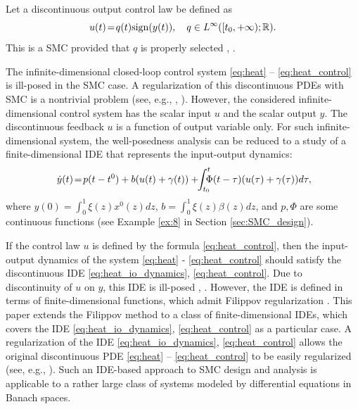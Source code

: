 \documentclass{article}
\newcommand{\R}{\mathbb{R}}
\newcommand{\sign}{\mathrm{sign}}
\begin{document}
Let  a discontinuous output control law  be defined as \vspace{-1mm}
\begin{equation}\label{eq:heat_control}
	u(t)\!=\!q(t)\sign(y(t)), \quad q\in L^{\infty}([t_0,+\infty);\R). \vspace{-1mm}
\end{equation}
This is a SMC  provided that $q$  is properly selected  \cite{Orlov_elal2004:IJC}, \cite{Orlov2020:Book}.

The infinite-dimensional closed-loop control system \eqref{eq:heat} -- \eqref{eq:heat_control} is ill-posed in the SMC case.  A regularization of this discontinuous PDEs  with SMC is a nontrivial problem 
 (see, e.g., \cite[pages 24-28]{Orlov2020:Book}, \cite{Mohet_etal2023:SCL}). 
 However, the considered infinite-dimensional control system has the scalar  input $u$ and the scalar output $y$. The discontinuous feedback $u$ is a function of  output variable only. For such infinite-dimensional system, the well-posedness analysis can be reduced to a study of a finite-dimensional IDE that represents the input-output dynamics:
 \vspace{-2mm}
\begin{equation}\label{eq:heat_io_dynamics}
\! \,	\dot y(t)\!=\!p(t-t^0)+b(u(t)+\gamma(t))+\!\!\int^t_{t_0} \!\!\!\!\Phi(t-\tau)(u(\tau) +\gamma (\tau)) d\tau,\!\!\vspace{-2mm}
\end{equation}
where $y(0)=\int^1_0 \xi(z)x^0(z) dz$, $b=\int^1_0 \xi(z)\beta(z) dz$,  and $p, \Phi$ are some continuous functions 
(see Example \ref{ex:8} in Section \ref{sec:SMC_design}).

If the control law  $u$ is defined by the formula \eqref{eq:heat_control}, then the input-output dynamics of 
the system \eqref{eq:heat} - \eqref{eq:heat_control} 
should satisfy the discontinuous IDE \eqref{eq:heat_io_dynamics}, \eqref{eq:heat_control}. Due to discontinuity of $u$ on $y$, this IDE is ill-posed  \cite{Lakshmikantham_etal1995:Book},
 \cite{OReganMeehan1998:Book}.  However, the  IDE is defined in terms of finite-dimensional functions, which admit Filippov regularization \cite{Filippov1988:Book}.  
 This paper extends the Filippov method to a class of finite-dimensional IDEs, which covers the IDE \eqref{eq:heat_io_dynamics}, \eqref{eq:heat_control}  as a particular case. 
 A regularization of the IDE \eqref{eq:heat_io_dynamics}, \eqref{eq:heat_control}  allows  the original discontinuous PDE  \eqref{eq:heat} -- \eqref{eq:heat_control} to be easily regularized (see, e.g., \cite{Polyakov2025:CDC}).
Such an IDE-based approach to SMC design and analysis is applicable to a rather large class of systems modeled by differential equations in Banach spaces.\vspace{-3mm}
\end{document}
